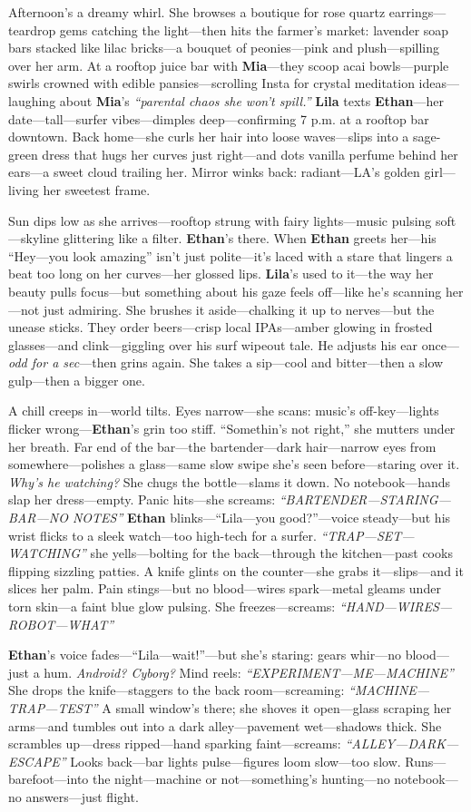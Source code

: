 \documentclass{article}
\begin{document}
Afternoon’s a dreamy whirl. She browses a boutique for rose quartz earrings—teardrop gems catching the light—then hits the farmer’s market: lavender soap bars stacked like lilac bricks—a bouquet of peonies—pink and plush—spilling over her arm. At a rooftop juice bar with \textbf{Mia}—they scoop acai bowls—purple swirls crowned with edible pansies—scrolling Insta for crystal meditation ideas—laughing about \textbf{Mia}’s \textit{“parental chaos she won’t spill.”} \textbf{Lila} texts \textbf{Ethan}—her date—tall—surfer vibes—dimples deep—confirming 7 p.m. at a rooftop bar downtown. Back home—she curls her hair into loose waves—slips into a sage-green dress that hugs her curves just right—and dots vanilla perfume behind her ears—a sweet cloud trailing her. Mirror winks back: radiant—LA’s golden girl—living her sweetest frame.

Sun dips low as she arrives—rooftop strung with fairy lights—music pulsing soft—skyline glittering like a filter. \textbf{Ethan}’s there. When \textbf{Ethan} greets her—his “Hey—you look amazing” isn’t just polite—it’s laced with a stare that lingers a beat too long on her curves—her glossed lips. \textbf{Lila}’s used to it—the way her beauty pulls focus—but something about his gaze feels off—like he’s scanning her—not just admiring. She brushes it aside—chalking it up to nerves—but the unease sticks. They order beers—crisp local IPAs—amber glowing in frosted glasses—and clink—giggling over his surf wipeout tale. He adjusts his ear once—\textit{odd for a sec}—then grins again. She takes a sip—cool and bitter—then a slow gulp—then a bigger one.

A chill creeps in—world tilts. Eyes narrow—she scans: music’s off-key—lights flicker wrong—\textbf{Ethan}’s grin too stiff. “Somethin’s not right,” she mutters under her breath. Far end of the bar—the bartender—dark hair—narrow eyes from somewhere—polishes a glass—same slow swipe she’s seen before—staring over it. \textit{Why’s he watching?} She chugs the bottle—slams it down. No notebook—hands slap her dress—empty. Panic hits—she screams: \textit{“BARTENDER—STARING—BAR—NO NOTES”} \textbf{Ethan} blinks—“Lila—you good?”—voice steady—but his wrist flicks to a sleek watch—too high-tech for a surfer. \textit{“TRAP—SET—WATCHING”} she yells—bolting for the back—through the kitchen—past cooks flipping sizzling patties. A knife glints on the counter—she grabs it—slips—and it slices her palm. Pain stings—but no blood—wires spark—metal gleams under torn skin—a faint blue glow pulsing. She freezes—screams: \textit{“HAND—WIRES—ROBOT—WHAT”}

\textbf{Ethan}’s voice fades—“Lila—wait!”—but she’s staring: gears whir—no blood—just a hum. \textit{Android? Cyborg?} Mind reels: \textit{“EXPERIMENT—ME—MACHINE”} She drops the knife—staggers to the back room—screaming: \textit{“MACHINE—TRAP—TEST”} A small window’s there; she shoves it open—glass scraping her arms—and tumbles out into a dark alley—pavement wet—shadows thick. She scrambles up—dress ripped—hand sparking faint—screams: \textit{“ALLEY—DARK—ESCAPE”} Looks back—bar lights pulse—figures loom slow—too slow. Runs—barefoot—into the night—machine or not—something’s hunting—no notebook—no answers—just flight.
\end{document}
